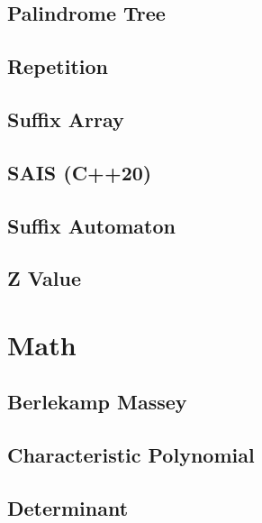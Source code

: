 \subsection{Palindrome Tree}

\subsection{Repetition}

\subsection{Suffix Array}

\subsection{SAIS (C++20)}

\subsection{Suffix Automaton}

% 
\subsection{Z Value}


\section{Math}
\subsection{Berlekamp Massey}

%
\subsection{Characteristic Polynomial}

\subsection{Determinant}

